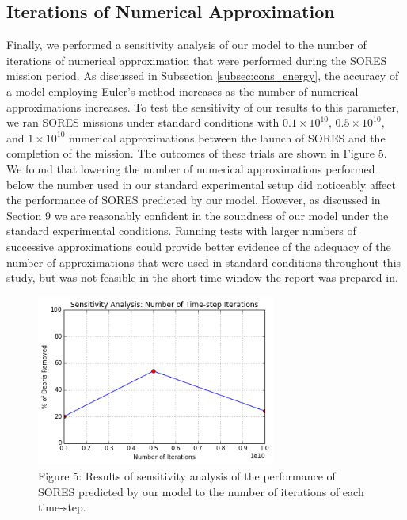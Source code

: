 \documentclass[12pt]{scrartcl}
\begin{document}
\subsection{Iterations of Numerical Approximation}
Finally, we performed a sensitivity analysis of our model to the number of iterations of numerical approximation that were performed during the SORES mission period. As discussed in Subsection \ref{subsec:cons_energy}, the accuracy of a model employing Euler's method increases as the number of numerical approximations increases. To test the sensitivity of our results to this parameter, we ran SORES missions under standard conditions with $0.1 \times 10^{10}$, $0.5 \times 10^{10}$, and $1 \times 10^{10}$ numerical approximations between the launch of SORES and the completion of the mission. The outcomes of these trials are shown in Figure 5. We found that lowering the number of numerical approximations performed below the number used in our standard experimental setup did noticeably affect the performance of SORES predicted by our model. However, as discussed in Section 9  we are reasonably confident in the soundness of our model under the standard experimental conditions. Running tests with larger numbers of successive approximations could provide better evidence of the adequacy of the number of approximations that were used in standard conditions throughout this study, but was not feasible in the short time window the report was prepared in.
\begin{figure}
\begin{center}
\label{fig:iterationsensitivity}
\includegraphics[width=0.7\textwidth]{iterations.png}\\
Figure 5: Results of sensitivity analysis of the performance of SORES predicted by our model to the number of iterations of each time-step.
\end{center}
\end{figure}
\end{document}
